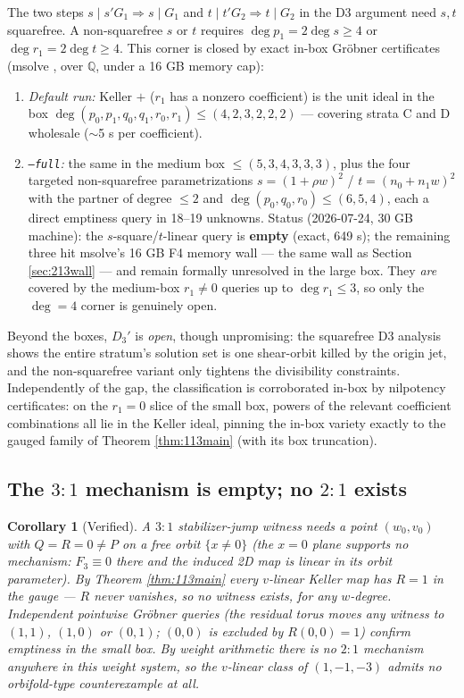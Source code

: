 \documentclass[11pt]{article}
\newtheorem{corollary}[theorem]{Corollary}
\theoremstyle{definition}
\theoremstyle{remark}
\newcommand{\Q}{\mathbb{Q}}
\begin{document}
The two steps $s \mid s'G_1 \Rightarrow s \mid G_1$ and
$t \mid t'G_2 \Rightarrow t \mid G_2$ in the D3 argument need $s,t$
squarefree. A non-squarefree $s$ or $t$ requires $\deg p_1 = 2\deg s
\ge 4$ or $\deg r_1 = 2\deg t \ge 4$. This corner is closed by exact
in-box Gr\"obner certificates (msolve \cite{msolve}, over $\Q$, under a
16 GB memory cap):
\begin{enumerate}
\item \emph{Default run:} Keller $+$ ($r_1$ has a nonzero coefficient)
 is the unit ideal in the box
 $\deg(p_0,p_1,q_0,q_1,r_0,r_1) \le (4,2,3,2,2,2)$ --- covering strata
 C and D wholesale ($\sim$5 s per coefficient).
\item \emph{\texttt{--full}:} the same in the medium box
 $\le (5,3,4,3,3,3)$, plus the four targeted non-squarefree
 parametrizations $s = (1+\rho w)^2$ / $t = (n_0 + n_1w)^2$ with the
 partner of degree $\le 2$ and $\deg(p_0,q_0,r_0) \le (6,5,4)$, each a
 direct emptiness query in 18--19 unknowns. Status (2026-07-24, 30 GB
 machine): the $s$-square/$t$-linear query is \textbf{empty} (exact,
 649 s); the remaining three hit msolve's 16 GB F4 memory wall --- the
 same wall as Section \ref{sec:213wall} --- and remain formally
 unresolved in the large box. They \emph{are} covered by the
 medium-box $r_1 \ne 0$ queries up to $\deg r_1 \le 3$, so only the
 $\deg = 4$ corner is genuinely open.
\end{enumerate}
Beyond the boxes, $D_3'$ is \emph{open}, though unpromising: the
squarefree D3 analysis shows the entire stratum's solution set is one
shear-orbit killed by the origin jet, and the non-squarefree variant
only tightens the divisibility constraints. Independently of the gap,
the classification is corroborated in-box by nilpotency certificates:
on the $r_1 = 0$ slice of the small box, powers of the relevant
coefficient combinations all lie in the Keller ideal, pinning the
in-box variety exactly to the gauged family of Theorem
\ref{thm:113main} (with its box truncation).

\subsection{The \texorpdfstring{$3{:}1$}{3:1} mechanism is empty; no
\texorpdfstring{$2{:}1$}{2:1} exists}

\begin{corollary}[Verified]\label{cor:31}
A $3{:}1$ stabilizer-jump witness needs a point $(w_0,v_0)$ with
$Q = R = 0 \ne P$ on a free orbit $\{x \ne 0\}$ (the $x=0$ plane
supports no mechanism: $F_3 \equiv 0$ there and the induced 2D map is
linear in its orbit parameter). By Theorem \ref{thm:113main} every
$v$-linear Keller map has $R = 1$ in the gauge --- $R$ never vanishes,
so no witness exists, for any $w$-degree. Independent pointwise
Gr\"obner queries (the residual torus moves any witness to $(1,1)$,
$(1,0)$ or $(0,1)$; $(0,0)$ is excluded by $R(0,0)=1$) confirm
emptiness in the small box. By weight arithmetic there is no $2{:}1$
mechanism anywhere in this weight system, so the $v$-linear class of
$(1,-1,-3)$ admits no orbifold-type counterexample at all.
\end{corollary}
\end{document}
